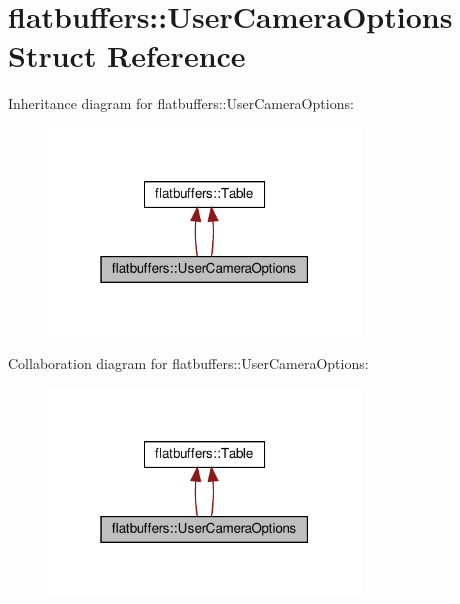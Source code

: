 \hypertarget{structflatbuffers_1_1UserCameraOptions}{}\section{flatbuffers\+:\+:User\+Camera\+Options Struct Reference}
\label{structflatbuffers_1_1UserCameraOptions}


Inheritance diagram for flatbuffers\+:\+:User\+Camera\+Options\+:
\nopagebreak
\begin{figure}[H]
\begin{center}
\leavevmode
\includegraphics[width=235pt]{structflatbuffers_1_1UserCameraOptions__inherit__graph}
\end{center}
\end{figure}


Collaboration diagram for flatbuffers\+:\+:User\+Camera\+Options\+:
\nopagebreak
\begin{figure}[H]
\begin{center}
\leavevmode
\includegraphics[width=235pt]{structflatbuffers_1_1UserCameraOptions__coll__graph}
\end{center}
\end{figure}
